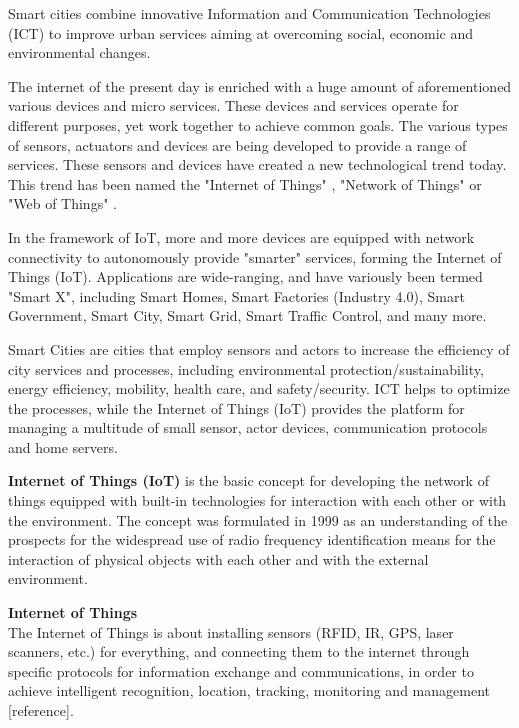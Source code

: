 Smart cities combine innovative Information and Communication Technologies (ICT) to improve urban services aiming at overcoming social, economic and environmental changes. 

The internet of the present day is enriched with a huge amount of aforementioned various devices and micro services. These devices and services operate for different purposes, yet work together to achieve common goals. The various types of sensors, actuators and devices are being developed to provide a range of services. These sensors and devices have created a new technological trend today. This trend has been named the "Internet of Things" \cite{WeberRomana2010}, "Network of Things" \cite{Gubbi+2013} or "Web of Things" \cite{Guinard+2010}. 

In the framework of IoT, more and more devices are equipped with network connectivity to autonomously provide "smarter" services, forming the Internet of Things (IoT). Applications are wide-ranging, and have variously been termed "Smart X", including Smart Homes, Smart Factories (Industry 4.0), Smart Government, Smart City, Smart Grid, Smart Traffic Control, and many more.

Smart Cities are cities that employ sensors and actors to increase the efficiency of city services and processes, including environmental protection/sustainability, energy efficiency, mobility, health care, and safety/security. ICT helps to optimize the processes, while the Internet of Things (IoT) provides the platform for managing a multitude of small sensor, actor devices, communication protocols and home servers.

\textbf{Internet of Things (IoT)} \cite{WeberRomana2010} is the basic concept for developing the network of things equipped with built-in technologies for interaction with each other or with the environment. The concept was formulated in 1999 as an understanding of the prospects for the widespread use of radio frequency identification means for the interaction of physical objects with each other and with the external environment. 
\begin{definition}
\textbf{Internet of Things}\label{definition:internetOfThings}\\
The Internet of Things is about installing sensors (RFID, IR, GPS, laser scanners, etc.) for everything, and connecting them to the internet through specific protocols for information exchange and communications, in order to achieve intelligent recognition, location, tracking, monitoring and management [reference].
\end{definition}

